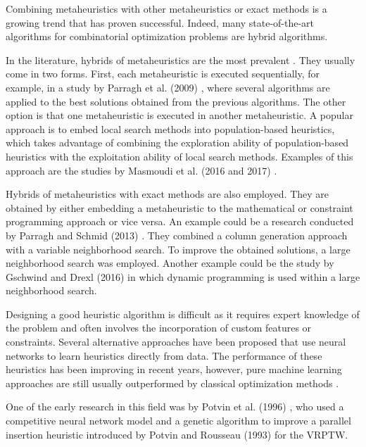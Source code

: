 
Combining metaheuristics with other metaheuristics or exact methods is a growing trend that has proven successful. Indeed, many state-of-the-art algorithms for combinatorial optimization problems are hybrid algorithms.

In the literature, hybrids of metaheuristics are the most prevalent \cite{darp-survey}. They usually come in two forms. First, each metaheuristic is executed sequentially, for example, in a study by Parragh et al. (2009) \cite{Parragh2009}, where several algorithms are applied to the best solutions obtained from the previous algorithms. The other option is that one metaheuristic is executed in another metaheuristic. A popular approach is to embed local search methods into population-based heuristics, which takes advantage of combining the exploration ability of population-based heuristics with the exploitation ability of local search methods. Examples of this approach are the studies by Masmoudi et al. (2016 and 2017) \cite{Masmoudi2016, Masmoudi2017}.

Hybrids of metaheuristics with exact methods are also employed. They are obtained by either embedding a metaheuristic to the mathematical or constraint programming approach or vice versa. An example could be a research conducted by Parragh and Schmid (2013) \cite{Parragh2013}. They combined a column generation approach with a variable neighborhood search. To improve the obtained solutions, a large neighborhood search was employed. Another example could be the study by Gschwind and Drexl (2016) \cite{Gschwind2016} in which dynamic programming
is used within a large neighborhood search.

 \label{sec:machine-learning}

Designing a good heuristic algorithm is difficult as it requires expert knowledge of the problem and often involves the incorporation of custom features or constraints. Several alternative approaches have been proposed that use neural networks to learn heuristics directly from data. The performance of these heuristics has been improving in recent years, however, pure machine learning approaches are still usually outperformed by classical optimization methods \cite{Peng2020, Hottung2019}.

One of the early research in this field was by Potvin et al. (1996) \cite{Potvin1996}, who used a competitive neural network model and a genetic algorithm to improve a parallel insertion heuristic introduced by Potvin and Rousseau (1993) \cite{POTVIN1993331} for the VRPTW.

